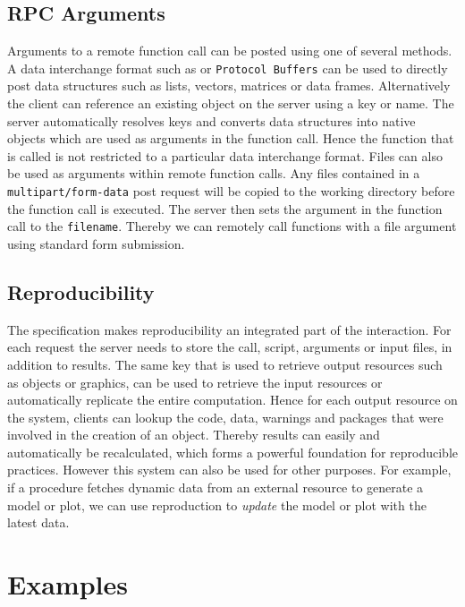 \subsection{RPC Arguments}

Arguments to a remote function call can be posted using one of several methods. A data interchange format such as \JSON or \texttt{Protocol Buffers} can be used to directly post data structures such as lists, vectors, matrices or data frames. Alternatively the client can reference an existing object on the server using a key or name. The server automatically resolves keys and converts data structures into native objects which are used as arguments in the function call. Hence the function that is called is not restricted to a particular data interchange format. Files can also be used as arguments within remote function calls. Any files contained in a \texttt{multipart/form-data}  post request will be copied to the working directory before the function call is executed. The server then sets the argument in the function call to the \texttt{filename}. Thereby we can remotely call functions with a file argument using standard \HTML form submission.


\subsection{Reproducibility}

The \OpenCPU specification makes reproducibility an integrated part of the \API interaction. For each \RPC request the server needs to store the call, script, arguments or input files, in addition to results. The same key that is used to retrieve output resources such as objects or graphics, can be used to retrieve the input resources or automatically replicate the entire computation. Hence for each output resource on the system, clients can lookup the code, data, warnings and packages that were involved in the creation of an object. Thereby results can easily and automatically be recalculated, which forms a powerful foundation for reproducible practices. However this system can also be used for other purposes. For example, if a procedure fetches dynamic data from an external resource to generate a model or plot, we can use reproduction to \emph{update} the model or plot with the latest data.

\section{Examples}
